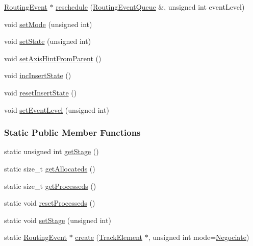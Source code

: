 \begin{DoxyCompactItemize}
\item 
\mbox{\hyperlink{classKite_1_1RoutingEvent}{Routing\+Event}} $\ast$ \mbox{\hyperlink{classKite_1_1RoutingEvent_abf2d02f18f96183fc6e78f3e6dc8cbf6}{reschedule}} (\mbox{\hyperlink{classKite_1_1RoutingEventQueue}{Routing\+Event\+Queue}} \&, unsigned int event\+Level)
\item 
void \mbox{\hyperlink{classKite_1_1RoutingEvent_a85982827650655ef9d6e1206874ead69}{set\+Mode}} (unsigned int)
\item 
void \mbox{\hyperlink{classKite_1_1RoutingEvent_af7ce7f73feb28f3df8f3180632a2f731}{set\+State}} (unsigned int)
\item 
void \mbox{\hyperlink{classKite_1_1RoutingEvent_a02a3f1f2801d4ebbbe676e062878faae}{set\+Axis\+Hint\+From\+Parent}} ()
\item 
void \mbox{\hyperlink{classKite_1_1RoutingEvent_a86c4b1b3d406c12667188ad44ce366db}{inc\+Insert\+State}} ()
\item 
void \mbox{\hyperlink{classKite_1_1RoutingEvent_ae35f271a106f6c6a6039e4a6f8bf4009}{reset\+Insert\+State}} ()
\item 
void \mbox{\hyperlink{classKite_1_1RoutingEvent_a70a9ecd62b806eff001aa602132cc630}{set\+Event\+Level}} (unsigned int)
\end{DoxyCompactItemize}
\subsubsection*{Static Public Member Functions}
\begin{DoxyCompactItemize}
\item 
static unsigned int \mbox{\hyperlink{classKite_1_1RoutingEvent_a110307ff26b264ea83f69aa1bab23626}{get\+Stage}} ()
\item 
static size\+\_\+t \mbox{\hyperlink{classKite_1_1RoutingEvent_a91c8bc1a6bdb1b15c3c084ebfd38af47}{get\+Allocateds}} ()
\item 
static size\+\_\+t \mbox{\hyperlink{classKite_1_1RoutingEvent_a0a3993330692b7eb816e9c776d161ad1}{get\+Processeds}} ()
\item 
static void \mbox{\hyperlink{classKite_1_1RoutingEvent_a6cf10bb4e4488948e4c616c55a8e6514}{reset\+Processeds}} ()
\item 
static void \mbox{\hyperlink{classKite_1_1RoutingEvent_a7300c33d439e453796b170eeaf4bf04d}{set\+Stage}} (unsigned int)
\item 
static \mbox{\hyperlink{classKite_1_1RoutingEvent}{Routing\+Event}} $\ast$ \mbox{\hyperlink{classKite_1_1RoutingEvent_a131ef83c7a57a64aed4f698c0433dffa}{create}} (\mbox{\hyperlink{classKite_1_1TrackElement}{Track\+Element}} $\ast$, unsigned int mode=\mbox{\hyperlink{classKite_1_1RoutingEvent_a46c8a310cf4c094f8c80e1cb8dc1f911a3980b02882c46c9bd4caf15040b85d1a}{Negociate}})
\end{DoxyCompactItemize}


